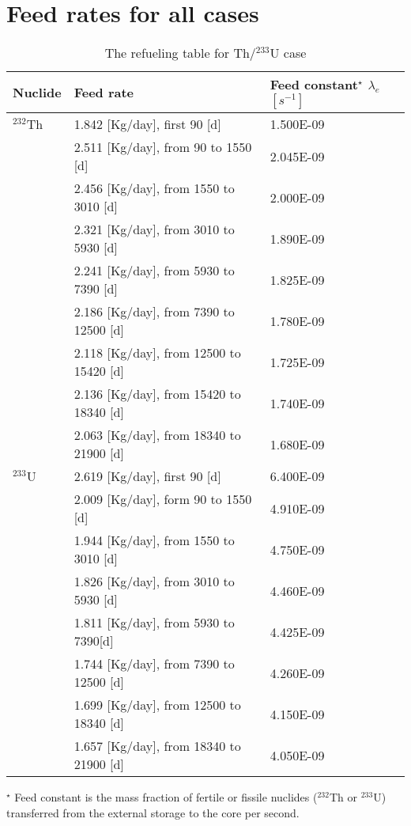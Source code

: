 \section{Feed rates for all cases}
\setcounter{table}{0}  
\begin{table}[ht!]
	\centering
	\caption{The refueling table for Th/$^{233}$U case} 
	\vspace{1ex}
	\begin{tabularx}{\textwidth}{|p{1.5cm}|b|p{1.9cm}|}
		\hline
		\textbf{Nuclide} & \textbf{Feed rate} & \textbf{Feed constant$^{\star}$} $\lambda_{e}$ $[s^{-1}]$ \\
		\hline
 $^{232}$Th        &  1.842 [Kg/day], first 90 [d] & 1.500E-09 \\
	&  2.511 [Kg/day], from 90 to 1550 [d] & 		2.045E-09 \\
	&  2.456 [Kg/day], from 1550 to 3010 [d] & 		2.000E-09 \\
	&  2.321 [Kg/day], from 3010 to 5930 [d]& 		1.890E-09	\\
	&  2.241 [Kg/day], from 5930 to 7390 [d] &		1.825E-09	\\
	&  2.186 [Kg/day], from 7390 to 12500 [d] &		1.780E-09	\\
	&  2.118 [Kg/day], from 12500 to 15420 [d] &	1.725E-09	\\
	&  2.136 [Kg/day], from 15420 to 18340 [d]&		1.740E-09		\\
	&  2.063 [Kg/day], from 18340 to 21900 [d]&		1.680E-09	 \\ 
 \hline
$^{233}$U & 2.619 [Kg/day], first 90 [d]	&   6.400E-09  \\
	& 2.009 [Kg/day],  form 90 to 1550 [d] &	4.910E-09 \\
	& 1.944 [Kg/day], from 1550 to 3010 [d] &	4.750E-09 \\
	& 1.826 [Kg/day],  from 3010 to 5930 [d] &	4.460E-09 \\
	& 1.811 [Kg/day],  from 5930 to 7390[d] &	4.425E-09 \\
	& 1.744 [Kg/day], from 7390 to 12500 [d] &	4.260E-09 \\
	& 1.699 [Kg/day], from 12500 to 18340 [d]	& 4.150E-09 \\
	& 1.657 [Kg/day], from 18340 to 21900 [d]	& 4.050E-09 \\
\hline
\end{tabularx}
\begin{tablenotes}
	\small
	\item  $^{\star}$ Feed constant is the mass fraction of fertile or fissile nuclides ($^{232}$Th or $^{233}$U) transferred from the external storage to the core per second.
\end{tablenotes}
\label{tab:table8}
\end{table}	

